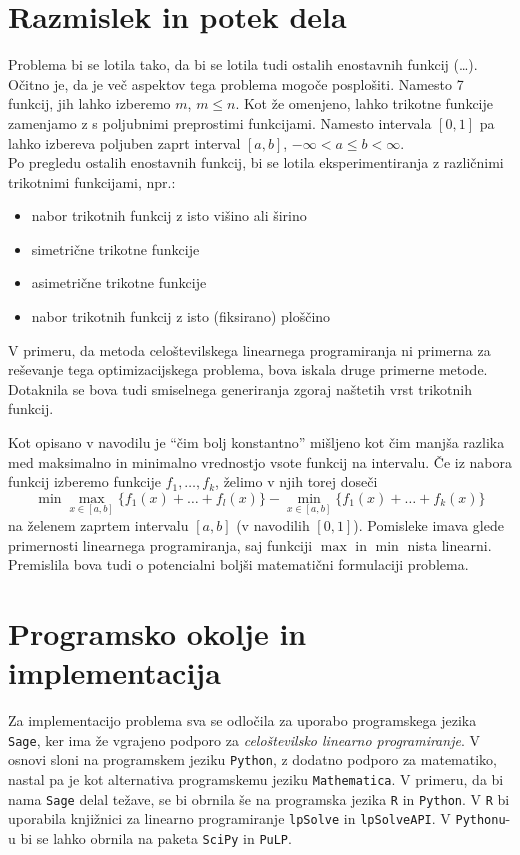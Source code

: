 \documentclass[11pt]{article}
\theoremstyle{definition}
\newcommand{\1}{\mathbbm{1}}
\newcommand{\set}[1]{\{#1\}}
\begin{document}
\section{Razmislek in potek dela}
\vspace{0.5cm}

Problema bi se lotila tako, da bi se lotila tudi ostalih enostavnih funkcij (\ldots). Očitno je, da je več aspektov tega problema mogoče posplošiti. Namesto 7 funkcij, jih lahko izberemo $m$, $m \leq n$. Kot že omenjeno, lahko trikotne funkcije zamenjamo z s poljubnimi preprostimi funkcijami. Namesto intervala $[0,1]$ pa lahko izbereva poljuben zaprt interval $[a,b]$, $-\infty < a \leq b < \infty$. \\

\noindent Po pregledu ostalih enostavnih funkcij, bi se lotila eksperimentiranja z različnimi trikotnimi funkcijami, npr.:
\begin{itemize}
	\item nabor trikotnih funkcij z isto višino ali širino
	\item simetrične trikotne funkcije
	\item asimetrične trikotne funkcije
	\item nabor trikotnih funkcij z isto (fiksirano) ploščino
\end{itemize}
\vspace{0.5cm}

\noindent V primeru, da metoda celoštevilskega linearnega programiranja ni primerna za reševanje tega optimizacijskega problema, bova iskala druge primerne metode. Dotaknila se bova tudi smiselnega generiranja zgoraj naštetih vrst trikotnih funkcij.

\noindent Kot opisano v navodilu je ``čim bolj konstantno'' mišljeno kot čim manjša razlika med maksimalno in minimalno vrednostjo vsote funkcij na intervalu. Če iz nabora funkcij izberemo funkcije $f_1,\ldots,f_k$, želimo v njih torej doseči
$$\min{\max_{x \in [a,b]}\set{f_1(x) + \ldots + f_l(x)} - \min_{x \in [a,b]}\set{f_1(x) + \ldots + f_k(x)}}$$
na želenem zaprtem intervalu $[a,b]$ (v navodilih $[0,1]$). Pomisleke imava glede primernosti linearnega programiranja, saj funkciji $\max$ in $\min$ nista linearni. Premislila bova tudi o potencialni boljši matematični formulaciji problema.

\section{Programsko okolje in implementacija}
\vspace{0.5cm}

Za implementacijo problema sva se odločila za uporabo programskega jezika \texttt{Sage}, ker ima že vgrajeno podporo za \textit{celoštevilsko linearno programiranje}. V osnovi sloni na programskem jeziku \texttt{Python}, z dodatno podporo za matematiko, nastal pa je kot alternativa programskemu jeziku \texttt{Mathematica}. V primeru, da bi nama \texttt{Sage} delal težave, se bi obrnila še na programska jezika \texttt{R} in \texttt{Python}. V \texttt{R} bi uporabila knjižnici za linearno programiranje \texttt{lpSolve} in \texttt{lpSolveAPI}. V \texttt{Pythonu}-u bi se lahko obrnila na paketa \texttt{SciPy} in \texttt{PuLP}.
\end{document}
